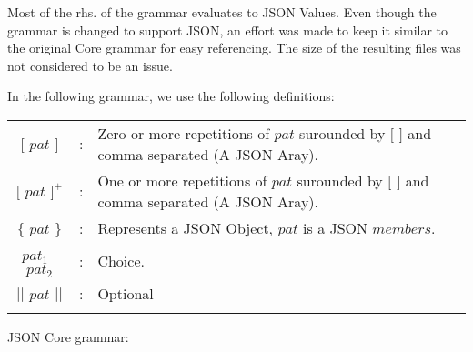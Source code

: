 \documentclass{article}
\begin{document}

Most of the rhs. of the grammar evaluates to JSON Values. 
Even though the grammar is changed to support JSON, an effort was made to
keep it similar to the original Core grammar for easy referencing. The size
of the resulting files was not considered to be an issue.

In the following grammar, we use the following definitions:



\begin{footnotesize}
\begin{longtable}{ c c l }


$[$ $pat$ $]$ 		& : 	& Zero or more repetitions of $pat$ surounded by $[$ $]$ and comma separated (A JSON Aray). 	\\
$[$ $pat$ $]^{+}$ 	& : 	& One or more repetitions of $pat$ surounded by $[$ $]$ and comma separated (A JSON Aray). 	\\ 
$\{$ $pat$ $\}$		& :	& Represents a JSON Object, $pat$ is a JSON $members$.						\\
$pat_{1}$ $|$ $pat_{2}$	& :	& Choice.											\\
$||$ $pat$ $||$ 	& :	& Optional											\\
\\[0.01in]

\end{longtable}
\end{footnotesize}

JSON Core grammar:
\end{document}
